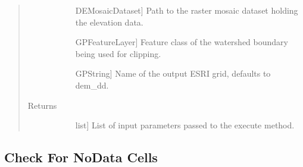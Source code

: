\documentclass[letterpaper,10pt,english]{sphinxmanual}
\begin{document}
\begin{fulllineitems}
\begin{fulllineitems}
\begin{quote}
\begin{description}
\begin{description}
\item[{}] \leavevmode{[}DEMosaicDataset{]}
Path to the raster mosaic dataset holding the elevation data.

\item[{}] \leavevmode{[}GPFeatureLayer{]}
Feature class of the watershed boundary being used for clipping.

\item[{}] \leavevmode{[}GPString{]}
Name of the output ESRI grid, defaults to dem\_dd.

\end{description}

\item[{Returns}] \leavevmode\begin{description}
\item[{}] \leavevmode{[}list{]}
List of input parameters passed to the execute method.

\end{description}

\end{description}\end{quote}

\end{fulllineitems}


\end{fulllineitems}



\subsection{Check For NoData Cells}
\label{\detokenize{StreamStats_DataPrep:check-for-nodata-cells}}
\end{document}
